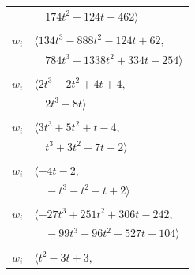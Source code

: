 \documentclass[11pt]{article}
\begin{document}
\begin{longtable}{@{}ll@{}}
 & $\quad 174t^{2}+124t-462\rangle$\\
\addlinespace[2pt]
\multicolumn{2}{@{}p{0.97\textwidth}@{}}{$i=12$, $D_i=1$, $\rho_{ij}$: $3{:}2, \allowbreak 5{:}2, \allowbreak 9{:}1, \allowbreak 13{:}2, \allowbreak 16{:}2, \allowbreak 20{:}1, \allowbreak 23{:}2, \allowbreak 24{:}2, \allowbreak 26{:}2, \allowbreak 28{:}2, \allowbreak 35{:}1$}\\
$w_i$ & $\langle 134t^{3}-888t^{2}-124t+62,$\\
 & $\quad 784t^{3}-1338t^{2}+334t-254\rangle$\\
\addlinespace[2pt]
\multicolumn{2}{@{}p{0.97\textwidth}@{}}{$i=13$, $D_i=1$, $\rho_{ij}$: $2{:}2, \allowbreak 5{:}1, \allowbreak 11{:}1, \allowbreak 12{:}1, \allowbreak 14{:}2, \allowbreak 18{:}1, \allowbreak 28{:}1$}\\
$w_i$ & $\langle 2t^{3}-2t^{2}+4t+4,$\\
 & $\quad 2t^{3}-8t\rangle$\\
\addlinespace[2pt]
\multicolumn{2}{@{}p{0.97\textwidth}@{}}{$i=14$, $D_i=1$, $\rho_{ij}$: $0{:}2, \allowbreak 2{:}1, \allowbreak 5{:}1, \allowbreak 11{:}2, \allowbreak 13{:}1, \allowbreak 16{:}1, \allowbreak 22{:}1$}\\
$w_i$ & $\langle 3t^{3}+5t^{2}+t-4,$\\
 & $\quad t^{3}+3t^{2}+7t+2\rangle$\\
\addlinespace[2pt]
\multicolumn{2}{@{}p{0.97\textwidth}@{}}{$i=15$, $D_i=1$, $\rho_{ij}$: $2{:}1, \allowbreak 9{:}1, \allowbreak 11{:}1, \allowbreak 19{:}1, \allowbreak 21{:}1, \allowbreak 33{:}1$}\\
$w_i$ & $\langle -4t-2,$\\
 & $\quad -t^{3}-t^{2}-t+2\rangle$\\
\addlinespace[2pt]
\multicolumn{2}{@{}p{0.97\textwidth}@{}}{$i=16$, $D_i=1$, $\rho_{ij}$: $0{:}2, \allowbreak 3{:}2, \allowbreak 4{:}1, \allowbreak 9{:}1, \allowbreak 12{:}1, \allowbreak 14{:}2, \allowbreak 17{:}2, \allowbreak 20{:}2, \allowbreak 26{:}2, \allowbreak 28{:}2, \allowbreak 33{:}1$}\\
$w_i$ & $\langle -27t^{3}+251t^{2}+306t-242,$\\
 & $\quad -99t^{3}-96t^{2}+527t-104\rangle$\\
\addlinespace[2pt]
\multicolumn{2}{@{}p{0.97\textwidth}@{}}{$i=17$, $D_i=1$, $\rho_{ij}$: $7{:}2, \allowbreak 9{:}2, \allowbreak 10{:}2, \allowbreak 16{:}1, \allowbreak 19{:}1, \allowbreak 28{:}2$}\\
$w_i$ & $\langle t^{2}-3t+3,$\\

\end{longtable}
\end{document}
